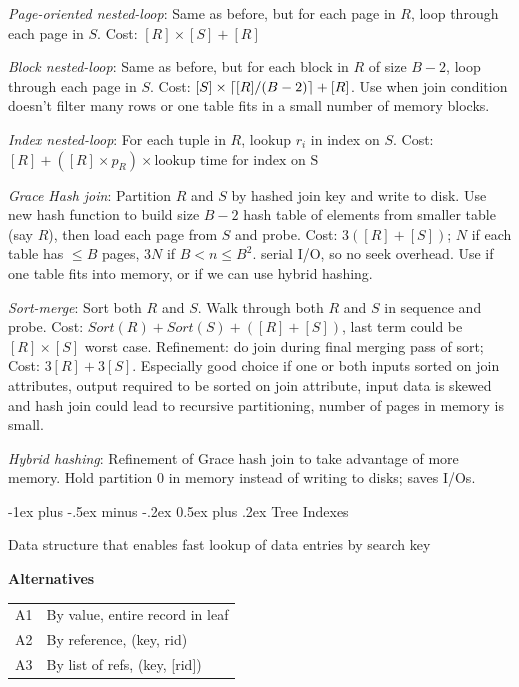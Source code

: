 \documentclass[10pt,landscape]{article}
\makeatletter
\DeclarePairedDelimiter{\ceil}{\lceil}{\rceil}
\renewcommand{\section}{\@startsection{section}{1}{0mm}%
                                {-1ex plus -.5ex minus -.2ex}%
                                {0.5ex plus .2ex}%
                                {\normalfont\large\bfseries}}
\makeatother
\begin{document}
\begin{multicols}{3}
\textit{Page-oriented nested-loop}: Same as before, but for each page in $R$, loop through each page in $S$. Cost: $[R] \times [S] + [R]$

\textit{Block nested-loop}: Same as before, but for each block in $R$ of size $B-2$, loop through each page in $S$. Cost: $[S]\times\ceil*{[R] / (B-2)} + [R]$. Use when join condition doesn't filter many rows or one table fits in a small number of memory blocks.

\textit{Index nested-loop}: For each tuple in $R$, lookup $r_i$ in index on $S$. Cost: $[R] + ([R] \times p_R) \times \text{lookup time for index on S}$

\textit{Grace Hash join}: Partition $R$ and $S$ by hashed join key and write to disk. Use new hash function to build size $B-2$ hash table of elements from smaller table (say $R$), then load each page from $S$ and probe. Cost: $3([R]+[S])$; $N$ if each table has $\le B$ pages, $3N$ if $B < n \le B^2$. serial I/O, so no seek overhead. Use if one table fits into memory, or if we can use hybrid hashing.

\textit{Sort-merge}: Sort both $R$ and $S$. Walk through both $R$ and $S$ in sequence and probe. Cost: $Sort(R) + Sort(S) + ([R] + [S])$, last term could be $[R] \times [S]$ worst case. Refinement: do join during final merging pass of sort; Cost: $3[R] + 3[S]$. Especially good choice if one or both inputs sorted on join attributes, output required to be sorted on join attribute, input data is skewed and hash join could lead to recursive partitioning, number of pages in memory is small.

\textit{Hybrid hashing}: Refinement of Grace hash join to take advantage of more memory. Hold partition 0 in memory instead of writing to disks; saves I/Os.


\section{Tree Indexes}

Data structure that enables fast lookup of data entries by search key

\textbf{Alternatives}

\begin{tabular}{@{}ll@{}}
A1 & By value, entire record in leaf \\
A2 & By reference, (key, rid)\\
A3 & By list of refs, (key, [rid]) \\
\end{tabular}


\end{multicols}
\end{document}
